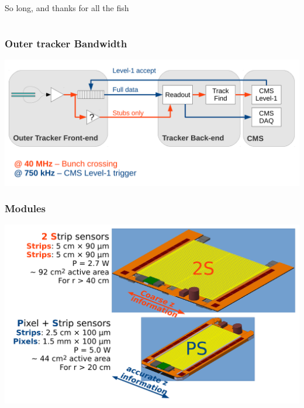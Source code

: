 \documentclass[pdftex, 11pt]{beamer}
\begin{document}
\begin{frame}
  So long, and thanks for all the fish
\end{frame}

\appendix

\section{\appendixname}

\begin{frame}[fragile]
  \frametitle{Outer tracker Bandwidth}
  \begin{center}
    \includegraphics[width=\textwidth]{img/bandwidth.pdf}
  \end{center}
\end{frame}

\begin{frame}
  \frametitle{Modules}
  \begin{center}
    \includegraphics[width=\textwidth]{img/modules.pdf}
  \end{center}
\end{frame}
\end{document}
